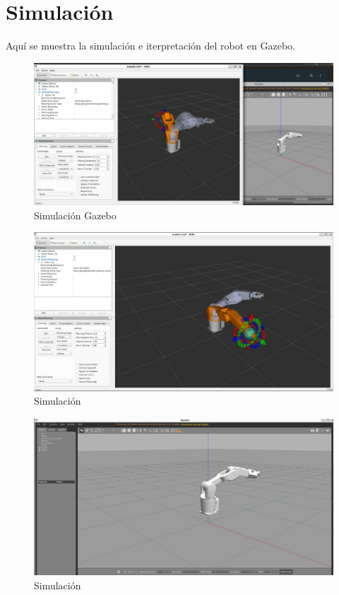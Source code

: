 \section{Simulación} \label{sec:simulacion}
Aquí se muestra la simulación e iterpretación del robot en Gazebo.

\begin{figure} [h]
	\centering
	\includegraphics[width=0.7\linewidth]{img/simulaciongazebo}
	\caption{Simulación Gazebo}
	\label{fig:simulaciongazebo}
\end{figure}

\begin{figure} [h]
	\centering
	\includegraphics[width=0.7\linewidth]{img/simulacion}
	\caption{Simulación}
	\label{fig:simulacion}
\end{figure}

\begin{figure} [h]
	\centering
	\includegraphics[width=0.7\linewidth]{img/simulacionjijija}
	\caption{Simulación}
	\label{fig:simulacionjijija}
\end{figure}
